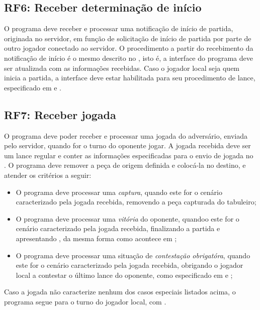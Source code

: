 \subsection{RF6: Receber determinação de início} \label{subsection:RF6} 
O programa deve receber e processar uma notificação de início de partida, originada no servidor, em função de 
solicitação de início de partida por parte de outro jogador conectado ao servidor. O procedimento a partir do 
recebimento da notificação de início é o mesmo descrito no , isto é, a interface do 
programa deve ser atualizada com as informações recebidas. Caso o jogador local seja quem inicia a partida, a interface 
deve estar habilitada para seu procedimento de lance, especificado em  e
.

\subsection{RF7: Receber jogada} \label{subsection:RF7} 
O programa deve poder receber e processar uma jogada do adversário, enviada pelo servidor, quando for o turno do oponente
jogar. A jogada recebida deve ser um lance regular e conter as informações especificadas para o envio de jogada no 
. O programa deve remover a peça de origem definida e colocá-la no destino, e 
atender os critérios a seguir:

\begin{itemize}
  \item O programa deve processar uma \textit{captura}, quando este for o cenário caracterizado pela jogada recebida, 
    removendo a peça capturada do tabuleiro;
  \item O programa deve processar uma \textit{vitória} do oponente, quandoo este for o cenário caracterizado pela jogada
    recebida, finalizando a partida e apresentando , da mesma forma como
    acontece em ;
  \item O programa deve processar uma situação de \textit{contestação obrigatóra}, quando este for o cenário
    caracterizado pela jogada recebida, obrigando o jogador local a contestar o último lance do oponente, como
    especificado em  e ;
\end{itemize}
Caso a jogada não caracterize nenhum dos casos especiais listados acima, o programa segue para o turno do jogador local,
com .

